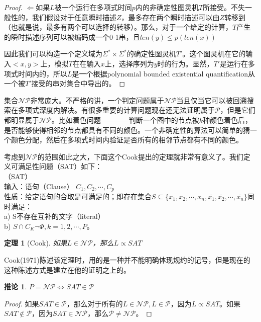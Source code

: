 \documentclass[twocolumn]{article}
\newtheorem{theorem}{\hspace{2em}定理}
\newtheorem{corollary}{\hspace{2em}推论}
\theoremstyle{nonumberplain}%
\newtheorem{proof}{\hspace{2em}证明}
\begin{document}
\begin{CJK}{UTF8}{gbsn}
\begin{proof}
        $\Leftarrow$如果$L$被一个运行在多项式时间$p$内的非确定性图灵机$T$所接受。不失一般性的，我们假设对于任意瞬时描述$Z$，最多存在两个瞬时描述可以由$Z$转移到（也就是说，最多有两个可以选择的转移）。那么，对于一个给定的计算，$T$产生的瞬时描述序列可以被编码成一个0-1串，且$len(y)\leq p(len(x))$

        因此我们可以构造一个定义域为$\Sigma^*\times\Sigma^*$的确定性图灵机$T'$。这个图灵机在它的输入$<x,y>$上，模拟$T$在在输入$x$上，选择序列为$y$时的行为。显然，$T'$是运行在多项式时间内的，所以$L$是一个根据polynomial bounded existential quantification从一个被$T'$接受的串对集合中导出的。
    \end{proof}

    集合$\mathcal{NP}$非常庞大。不严格的讲，一个判定问题属于$\mathcal{NP}$当且仅当它可以被回溯搜索在多项式深度内解决。有很多重要的计算问题现在还无法证明属于$\mathcal{P}$，但是它们都明显属于$\mathcal{NP}$。比如着色问题————判断一个图中的节点被$k$种颜色着色后，是否能够使得相邻的节点都具有不同的颜色。一个非确定性的算法可以简单的猜一个颜色分配，然后在多项式时间内验证是否所有的相邻节点都有不同的颜色。

    考虑到$\mathcal{NP}$的范围如此之大，下面这个Cook提出的定理就非常有意义了。我们定义可满足性问题（SAT）如下：\\
    {（SAT）}\\
    输入：语句（Clause） $C_1,C_2,\cdots,C_p$\\
    性质：给定语句的合取是可满足的；即存在集合$S\subseteq\{x_1,x_2,\cdots,x_n,\bar{x_1},\bar{x_2},\cdots,\bar{x_n}\}$同时满足：\\
    \indent a) S不存在互补的文字（literal）\\
    \indent b) $S\cap C_K\neg\Phi,k=1,2,\cdots,P$。
    
    \begin{theorem}[Cook]
        如果$L\in\mathcal{NP}$，那么$L\propto SAT$
    \end{theorem}
    
    Cook(1971)陈述该定理时，用的是一种并不能明确体现规约的记号，但是现在的这种陈述方式是建立在他的证明之上的。
    
    \begin{corollary}
        $P=\mathcal{NP} \Leftrightarrow SAT \in \mathcal{P}$
    \end{corollary}
    
    \begin{proof}
      如果$SAT\in\mathcal{P}$，那么对于所有的$L\in\mathcal{NP},L\in\mathcal{P}$，因为$L \propto SAT$。如果$SAT\not\in\mathcal{P}$，因为$SAT\in\mathcal{NP}$，那么$\mathcal{P}\neq\mathcal{NP}$。
    \end{proof}
    

\end{CJK}
\end{document}
